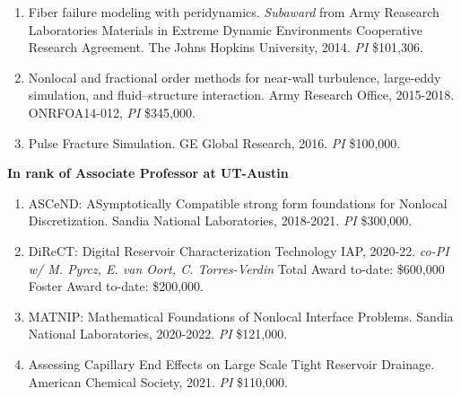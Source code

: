 \begin{enumerate}
  \item Fiber failure modeling with peridynamics. \textit{Subaward} from Army Reasearch Laboratories Materials in Extreme Dynamic Environments Cooperative Research Agreement.  The Johns Hopkins University, 2014. \textit{PI} \$101,306.
  \item Nonlocal and fractional order methods for near-wall turbulence, large-eddy simulation, and fluid--structure interaction. Army Research Office, 2015-2018. ONRFOA14-012, \textit{PI} {\$}345,000.
  \item Pulse Fracture Simulation. GE Global Research, 2016. \textit{PI} \$100,000.
\end{enumerate}
    \pagebreak[2]
    \textbf{In rank of Associate Professor at UT-Austin}
\begin{enumerate}[resume]
    \item ASCeND: ASymptotically Compatible strong form foundations for Nonlocal Discretization. Sandia National Laboratories, 2018-2021. \textit{PI} \$300,000.
    \item DiReCT: Digital Reservoir Characterization Technology IAP, 2020-22. \textit{co-PI w/ M. Pyrcz, E. van Oort, C. Torres-Verdin} Total Award to-date: \$600,000 Foster Award to-date: \$200,000.
    \item MATNIP: Mathematical Foundations of Nonlocal Interface Problems. Sandia National Laboratories, 2020-2022. \textit{PI} \$121,000. 
    \item Assessing Capillary End Effects on Large Scale Tight Reservoir Drainage.  American Chemical Society, 2021. \textit{PI} \$110,000.
\end{enumerate}
\else
\ifdefined\ispdf
